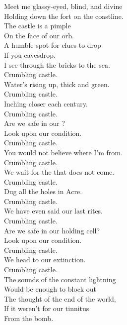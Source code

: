 
\label{album:polygondwanaland}





Meet me glassy-eyed, blind, and divine \\
Holding down the fort on the coastline. \\
The castle is a pimple \\
On the face of our orb. \\
A humble spot for clues to drop \\
If you eavesdrop. \\

I see through the bricks to the sea. \\
Crumbling castle. \\
Water's rising up, thick and green. \\
Crumbling castle. \\
Inching closer each century. \\
Crumbling castle. \\
Are we safe in our ? \\
Look upon our condition. \\
Crumbling castle. \\
You would not believe where I'm from. \\
Crumbling castle. \\

We wait for the  that does not come. \\
Crumbling castle. \\
Dug all the holes in  Acre. \\
Crumbling castle. \\
We have even said our last rites. \\
Crumbling castle. \\
Are we safe in our holding cell? \\
Look upon our condition. \\
Crumbling castle. \\
We head to our extinction. \\
Crumbling castle. \\

The sounds of the constant lightning \\
Would be enough to block out \\
The thought of the end of the world, \\
If it weren't for our tinnitus \\
From the bomb. \\

